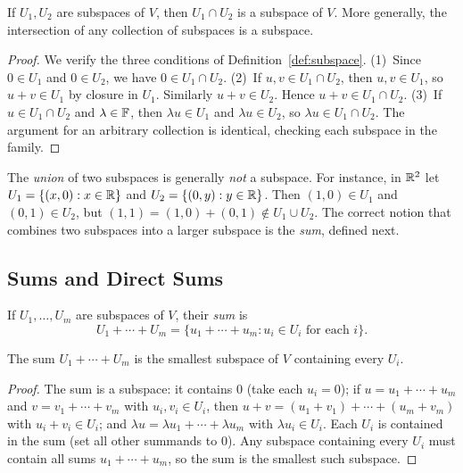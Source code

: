 \documentclass[11pt,a4paper]{article}
\begin{document}
\begin{proposition}
\label{prop:intersection}
If $U_1, U_2$ are subspaces of $V$, then $U_1 \cap U_2$ is a subspace of $V$.
More generally, the intersection of any collection of subspaces is a subspace.
\end{proposition}

\begin{proof}
We verify the three conditions of Definition~\ref{def:subspace}.
(1)~Since $0 \in U_1$ and $0 \in U_2$, we have $0 \in U_1 \cap U_2$.
(2)~If $u, v \in U_1 \cap U_2$, then $u, v \in U_1$, so $u + v \in U_1$ by
closure in $U_1$.  Similarly $u + v \in U_2$.  Hence $u + v \in U_1 \cap U_2$.
(3)~If $u \in U_1 \cap U_2$ and $\lambda \in \mathbb{F}$, then $\lambda u \in U_1$ and
$\lambda u \in U_2$, so $\lambda u \in U_1 \cap U_2$.
The argument for an arbitrary collection is identical, checking each subspace
in the family.
\end{proof}

\begin{warning}[title={Union of Subspaces}]
The \emph{union} of two subspaces is generally \emph{not} a subspace.  For instance,
in $\mathbb{R}^2$ let $U_1 = \{(x,0) : x \in \mathbb{R}\}$ and $U_2 = \{(0,y) : y \in \mathbb{R}\}$.
Then $(1,0) \in U_1$ and $(0,1) \in U_2$, but $(1,1) = (1,0) + (0,1) \notin
U_1 \cup U_2$.  The correct notion that combines two subspaces into a larger
subspace is the \emph{sum}, defined next.
\end{warning}

\subsection{Sums and Direct Sums}

\begin{definition}
\label{def:sum}
If $U_1, \ldots, U_m$ are subspaces of $V$, their \emph{sum} is
\[
  U_1 + \cdots + U_m
  = \{u_1 + \cdots + u_m : u_i \in U_i \text{ for each } i\}.
\]
\end{definition}

\begin{proposition}
\label{prop:sum_smallest}
The sum $U_1 + \cdots + U_m$ is the smallest subspace of $V$ containing every $U_i$.
\end{proposition}

\begin{proof}
The sum is a subspace: it contains $0$ (take each $u_i = 0$); if
$u = u_1 + \cdots + u_m$ and $v = v_1 + \cdots + v_m$ with $u_i, v_i \in U_i$,
then $u + v = (u_1 + v_1) + \cdots + (u_m + v_m)$ with $u_i + v_i \in U_i$;
and $\lambda u = \lambda u_1 + \cdots + \lambda u_m$ with $\lambda u_i \in U_i$.
Each $U_i$ is contained in the sum (set all other summands to $0$).  Any subspace
containing every $U_i$ must contain all sums $u_1 + \cdots + u_m$, so the sum
is the smallest such subspace.
\end{proof}
\end{document}
